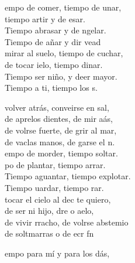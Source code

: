 \begin{cancion}
\begin{chorus}
		empo de comer, tiempo de unar,\\
		tiempo artir y de esar.\\
		Tiempo  abrasar y de ngelar.\\
		Tiempo de añar y dir vead\\
	\jump
		 mirar al suelo, tiempo de cuchar,\\
		de tocar ielo, tiempo dinar.\\
		Tiempo  ser niño, y deer mayor.\\
		Tiempo a ti, tiempo  los s.\jump\\
	\end{chorus}%
	 volver atrás, conveirse en sal,\\
	de aprelos dientes, de mir aás,\\
	de volrse fuerte, de grir al mar,\\
	de vaclas manos, de garse el n.\\
	\jump
	empo de morder, tiempo  soltar.\\
	po de plantar, tiempo  arrar.\\
	Tiempo  aguantar, tiempo  explotar.\\
	Tiempo uardar, tiempo  rar.\\
	\jump
	 tocar el cielo al dec te quiero,\\
	de ser ni hijo, dre o aelo,\\
	de vivir rracho, de volrse abstemio\\
	de soltmarras o de ecr  fn\jump\\
	\begin{chorus}%
		empo para mí y para los dás,\\

\end{chorus}
\end{cancion}
